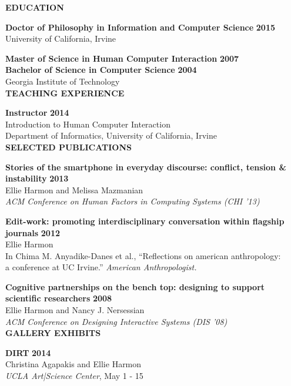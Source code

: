 \newcommand{\mypubentry}[4]{
    \textbf{#1} \hfill \textbf{#2} \\ 
    #3 \\
		#4
}

\curriculumvitae
{
\textbf{EDUCATION}
 
    \textbf{Doctor of Philosophy in Information and Computer Science} \hfill \textbf{2015}\\
    University of California, Irvine
  
    \textbf{Master of Science in Human Computer Interaction} \hfill \textbf{2007} \\
    \textbf{Bachelor of Science in Computer Science} \hfill \textbf{2004} \\
    Georgia Institute of Technology\\

\textbf{TEACHING EXPERIENCE}

    \textbf{Instructor} \hfill \textbf{2014} \\
    Introduction to Human Computer Interaction \\
    Department of Informatics, University of California, Irvine\\
	
\textbf{SELECTED PUBLICATIONS}

  \mypubentry{Stories of the smartphone in everyday discourse: conflict, tension \& instability}{2013}{Ellie Harmon and Melissa Mazmanian}{\emph{ACM Conference on Human Factors in Computing Systems (CHI '13)}}
	
  \mypubentry{Edit-work: promoting interdisciplinary conversation within flagship journals}{2012}{Ellie Harmon}{In Chima M. Anyadike-Danes et al., ``Reflections on american anthropology: \\
	a conference at UC Irvine.''\emph{ American Anthropologist.}}
	
  \mypubentry{Cognitive partnerships on the bench top: designing to support scientific researchers}{2008}{Ellie Harmon and Nancy J. Nersessian}{\emph{ACM Conference on Designing Interactive Systems (DIS '08)}}\\
	
	\textbf{GALLERY EXHIBITS}
	
		\mypubentry{DIRT}{2014}{Christina Agapakis and Ellie Harmon}{\emph{UCLA Art|Science Center}, May 1 - 15}

}

